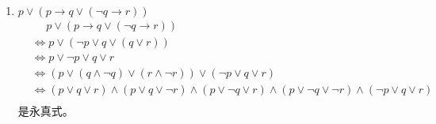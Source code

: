 \documentclass[UTF8]{ctexart}
\begin{document}
\begin{enumerate}
\begin{enumerate}
         \item $p \vee  ( p \rightarrow  q \vee  (\neg q \rightarrow  r))$
         \[
            \begin{aligned}
               &\mathrel{\phantom{=}}p \vee  ( p \rightarrow  q \vee  (\neg q \rightarrow  r))\\
               &\Leftrightarrow p\vee (\neg p \vee q \vee (q\vee r))\\
               &\Leftrightarrow p\vee \neg p \vee q \vee r\\
               &\Leftrightarrow (p\vee (q \wedge \neg q) \vee (r\wedge \neg r))\vee (\neg p \vee q \vee r)\\
               &\Leftrightarrow(p\vee q \vee r)\wedge(p\vee q \vee \neg r)\wedge(p\vee \neg q \vee r)\wedge(p\vee \neg q\vee \neg r)\wedge(\neg p \vee q \vee r)\\
            \end{aligned}
         \]
         是永真式。


\end{enumerate}
\end{enumerate}
\end{document}
